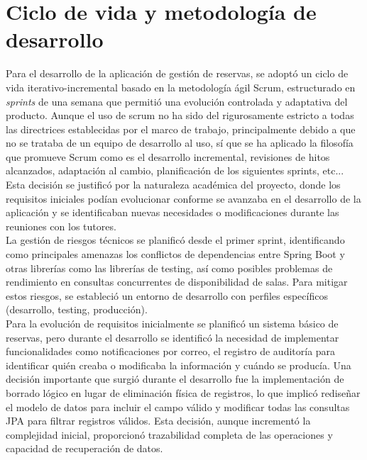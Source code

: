
\section{Ciclo de vida y metodología de desarrollo}\label{ciclo-de-vida-metodologia-desarrollo}
Para el desarrollo de la aplicación de gestión de reservas, se adoptó un ciclo de vida iterativo-incremental basado en la metodología ágil Scrum, estructurado en \emph{sprints} de una semana que permitió una evolución controlada y adaptativa del producto. Aunque el uso de scrum no ha sido del rigurosamente estricto a todas las directrices establecidas por el marco de trabajo, principalmente debido a que no se trataba de un equipo de desarrollo al uso, sí que se ha aplicado la filosofía que promueve Scrum como es el desarrollo incremental, revisiones de hitos alcanzados, adaptación al cambio, planificación de los siguientes sprints, etc... Esta decisión se justificó por la naturaleza académica del proyecto, donde los requisitos iniciales podían evolucionar conforme se avanzaba en el desarrollo de la aplicación y se identificaban nuevas necesidades o modificaciones durante las reuniones con los tutores.\\
La gestión de riesgos técnicos se planificó desde el primer sprint, identificando como principales amenazas los conflictos de dependencias entre Spring Boot y otras librerías como las librerías de testing, así como posibles problemas de rendimiento en consultas concurrentes de disponibilidad de salas. Para mitigar estos riesgos, se estableció un entorno de desarrollo con perfiles específicos (desarrollo, testing, producción).\\
Para la evolución de requisitos inicialmente se planificó un sistema básico de reservas, pero durante el desarrollo se identificó la necesidad de implementar funcionalidades como notificaciones por correo, el registro de auditoría para identificar quién creaba o modificaba la información y cuándo se producía. 
Una decisión importante que surgió durante el desarrollo fue la implementación de borrado lógico en lugar de eliminación física de registros, lo que implicó rediseñar el modelo de datos para incluir el campo válido y modificar todas las consultas JPA para filtrar registros válidos. Esta decisión, aunque incrementó la complejidad inicial, proporcionó trazabilidad completa de las operaciones y capacidad de recuperación de datos.\\
